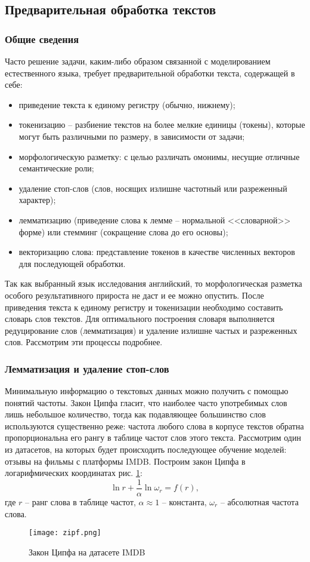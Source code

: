 \subsection{Предварительная обработка текстов}
\subsubsection{Общие сведения}

\par
Часто решение задачи, каким-либо образом связанной с моделированием естественного языка, требует предварительной обработки текста, содержащей в себе:
\begin{itemize}
    \item приведение текста к единому регистру (обычно, нижнему);
    \item токенизацию -- разбиение текстов на более мелкие единицы (токены), которые могут быть различными по размеру, в зависимости от задачи;
    \item морфологическую разметку: с целью различать омонимы, несущие отличные семантические роли;
    \item удаление стоп-слов (слов, носящих излишне частотный или разреженный характер);
    \item лемматизацию (приведение слова к лемме -- нормальной <<словарной>> форме) или стемминг (сокращение слова до его основы);
    \item векторизацию слова: представление токенов в качестве численных векторов для последующей обработки.
\end{itemize}

\bigskip\par
Так как выбранный язык исследования английский, то морфологическая разметка особого результативного прироста не даст и ее можно опустить. После приведения текста к единому регистру и токенизации необходимо составить словарь слов текстов. Для оптимального построения словаря выполняется редуцирование слов (лемматизация) и удаление излишне частых и разреженных слов. Рассмотрим эти процессы подробнее.  
\subsubsection{Лемматизация и удаление стоп-слов}
\par
Минимальную информацию о текстовых данных можно получить с помощью понятий частоты. Закон Ципфа гласит, что наиболее часто употребимых слов лишь небольшое количество, тогда как подавляющее большинство слов используются существенно реже: частота любого слова в корпусе текстов обратна пропорциональна его рангу в таблице частот слов этого текста. Рассмотрим один из датасетов, на которых будет происходить последующее обучение моделей: отзывы на фильмы с платформы IMDB. Построим закон Ципфа в логарифмических координатах рис. \ref{fig:zipf}:
\[\ln r + \dfrac{1}{\alpha}\ln \omega_r = f(r),\]
где $r$ -- ранг слова в таблице частот, $\alpha \approx 1$ -- константа, $\omega_r$ -- абсолютная частота слова.
\begin{figure}[H]
    \texttt{[image: zipf.png]}
    \caption{Закон Ципфа на датасете IMDB}
    \label{fig:zipf}
\end{figure}

